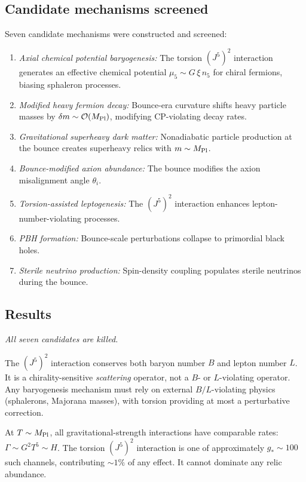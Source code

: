 \documentclass[aps,prd,twocolumn,superscriptaddress,showpacs,preprintnumbers,
  nofootinbib,longbibliography,floatfix]{revtex4-2}
\newcommand{\MPl}{M_{\rm Pl}}
\begin{document}
\subsection{Candidate mechanisms screened}

Seven candidate mechanisms were constructed and screened:
\begin{enumerate}[leftmargin=*,label=\Alph*.]
  \item \textit{Axial chemical potential baryogenesis:} The torsion
    $(J^5)^2$ interaction generates an effective chemical potential
    $\mu_5 \sim G\,\xi\,n_5$ for chiral fermions, biasing sphaleron
    processes.
  \item \textit{Modified heavy fermion decay:} Bounce-era curvature
    shifts heavy particle masses by $\delta m \sim \mathcal{O}(\MPl)$,
    modifying CP-violating decay rates.
  \item \textit{Gravitational superheavy dark matter:} Nonadiabatic
    particle production at the bounce creates superheavy relics with
    $m \sim \MPl$.
  \item \textit{Bounce-modified axion abundance:} The bounce modifies the
    axion misalignment angle $\theta_i$.
  \item \textit{Torsion-assisted leptogenesis:} The $(J^5)^2$ interaction
    enhances lepton-number-violating processes.
  \item \textit{PBH formation:} Bounce-scale perturbations collapse to
    primordial black holes.
  \item \textit{Sterile neutrino production:} Spin-density coupling
    populates sterile neutrinos during the bounce.
\end{enumerate}

\subsection{Results}

\textit{All seven candidates are killed.}

The $(J^5)^2$ interaction conserves both baryon number $B$ and lepton
number $L$. It is a chirality-sensitive \textit{scattering} operator, not
a $B$- or $L$-violating operator. Any baryogenesis mechanism must rely on
external $B/L$-violating physics (sphalerons, Majorana masses), with
torsion providing at most a perturbative correction.

At $T \sim \MPl$, all gravitational-strength interactions have comparable
rates: $\Gamma \sim G^2 T^5 \sim H$. The torsion $(J^5)^2$ interaction is
one of approximately $g_* \sim 100$ such channels, contributing
$\sim\!1\%$ of any effect. It cannot dominate any relic abundance.
\end{document}
